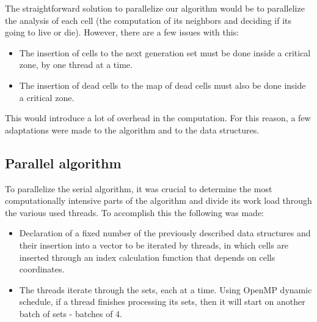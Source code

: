\documentclass[11pt,english]{article}
\begin{document}
The straightforward solution to parallelize our algorithm would be to 
parallelize the analysis of each cell (the computation of its neighbors and 
deciding if its going to live or die). However, there are a few issues with 
this:

\begin{itemize}
    \item{The insertion of cells to the next generation set must be done 
        inside a critical zone, by one thread at a time.}
    \item{The insertion of dead cells to the map of dead cells must also be 
        done inside a critical zone.}
\end{itemize}

This would introduce a lot of overhead in the computation. For this reason, a 
few adaptations were made to the algorithm and to the data structures.

\subsection{Parallel algorithm}

To parallelize the serial algorithm, it was crucial to determine the most computationally intensive parts of the algorithm and divide its work load through the various used threads. To accomplish this the following was made:
\begin{itemize}
    \item{Declaration of a fixed number of the previously described data structures and their insertion into a vector to be iterated by threads, in which cells are inserted through an index calculation function that depends on cells coordinates.}
    \item{The threads iterate through the sets, each at a time. Using OpenMP dynamic schedule, if a thread finishes processing its sets, then it will start on another batch of sets - batches of 4.}
\end{itemize}
\end{document}
